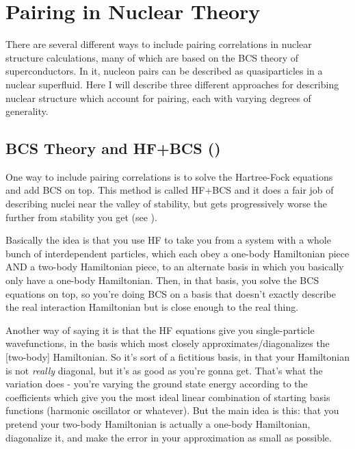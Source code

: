 \chapter{Pairing in Nuclear Theory}

\maketitle
There are several different ways to include pairing correlations in nuclear structure calculations, many of which are based on the BCS theory of superconductors. In it, nucleon pairs can be described as quasiparticles in a nuclear superfluid. Here I will describe three different approaches for describing nuclear structure which account for pairing, each with varying degrees of generality.

\section*{BCS Theory and HF+BCS (\cite{suhonen2007nucleons,Anguiano2013})}
One way to include pairing correlations is to solve the Hartree-Fock equations and add BCS on top. This method is called HF+BCS and it does a fair job of describing nuclei near the valley of stability, but gets progressively worse the further from stability you get (see \cite{Anguiano2013}).

Basically the idea is that you use HF to take you from a system with a whole bunch of interdependent particles, which each obey a one-body Hamiltonian piece AND a two-body Hamiltonian piece, to an alternate basis in which you basically only have a one-body Hamiltonian. Then, in that basis, you solve the BCS equations on top, so you're doing BCS on a basis that doesn't exactly describe the real interaction Hamiltonian but is close enough to the real thing.

Another way of saying it is that the HF equations give you single-particle wavefunctions, in the basis which most closely approximates/diagonalizes the [two-body] Hamiltonian. So it's sort of a fictitious basis, in that your Hamiltonian is not \textit{really} diagonal, but it's as good as you're gonna get. That's what the variation does - you're varying the ground state energy according to the coefficients which give you the most ideal linear combination of starting basis functions (harmonic oscillator or whatever). But the main idea is this: that you pretend your two-body Hamiltonian is actually a one-body Hamiltonian, diagonalize it, and make the error in your approximation as small as possible.

